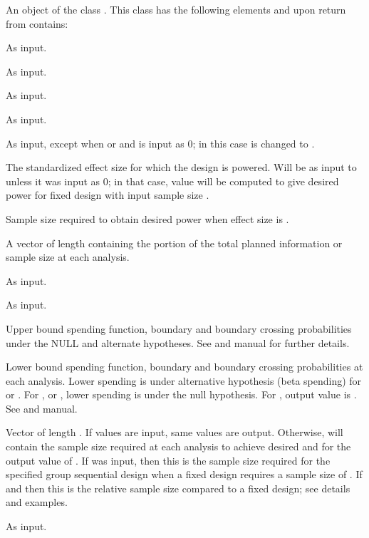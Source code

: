 \begin{Value}
An object of the class . This class has the following elements and upon return from 
 contains:
\begin{ldescription}
\item[\code{k}] As input.
\item[\code{test.type}] As input.
\item[\code{alpha}] As input.
\item[\code{beta}] As input.
\item[\code{astar}] As input, except when  or  and  is input as 0; in this case
 is changed to .
\item[\code{delta}] The standardized effect size for which the design is powered. Will be as input to 
unless it was input as 0; in that case, value will be computed to give desired power for fixed design with input
sample size .
\item[\code{n.fix}] Sample size required to obtain desired power when effect size is .
\item[\code{timing}] A vector of length  containing the portion of the total planned information or sample size at each analysis.
\item[\code{tol}] As input.
\item[\code{r}] As input.
\item[\code{upper}] Upper bound spending function, boundary and boundary crossing probabilities under the NULL and
alternate hypotheses. See  and manual for further details.
\item[\code{lower}] Lower bound spending function, boundary and boundary crossing probabilities at each analysis.
Lower spending is under alternative hypothesis (beta spending) for  or . 
For ,  or , lower spending is under the null hypothesis.
For , output value is . See  and manual.
\item[\code{n.I}] Vector of length . If values are input, same values are output.
Otherwise,  will contain the sample size required at each analysis 
to achieve desired  and  for the output value of . 
If  was input, then this is the sample size required for the specified group sequential design when a fixed design requires a sample size of .
If  and  then this is the relative sample size compared to a fixed design; see details and examples.
\item[\code{maxn.IPlan}] As input.
\end{ldescription}
\end{Value}
